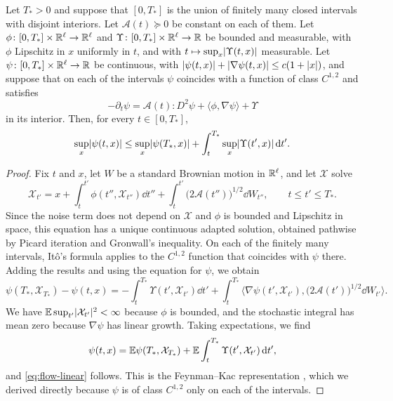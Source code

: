 \begin{lemma}\label{lem:flow-linear}
Let $T_*>0$ and suppose that $[0,T_*]$ is the union of finitely many closed
intervals with disjoint interiors. Let $\mathcal A(t)\succeq0$ be constant on each
of them. Let $\phi\colon[0,T_*]\times\mathbb R^\ell\to\mathbb R^\ell$ and
$\Upsilon\colon[0,T_*]\times\mathbb R^\ell\to\mathbb R$ be bounded and measurable, with $\phi$
Lipschitz in $x$ uniformly in $t$, and with $t\mapsto\sup_x\lvert \Upsilon(t,x)\rvert$
measurable. Let $\psi\colon[0,T_*]\times\mathbb R^\ell\to\mathbb R$ be continuous, with
$\lvert \psi(t,x)\rvert+\lvert \nabla\psi(t,x)\rvert\le c(1+\lvert x\rvert)$, and suppose that on each
of the intervals $\psi$ coincides with a function of class $C^{1,2}$ and satisfies
\[
 -\partial_t\psi=\mathcal A(t)\mathbin{:}D^2\psi+\langle\phi,\nabla\psi\rangle+\Upsilon
\]
in its interior. Then, for every $t\in[0,T_*]$,
\begin{equation}\label{eq:flow-linear}
 \sup_x\lvert \psi(t,x)\rvert\le\sup_x\lvert \psi(T_*,x)\rvert
 +\int_t^{T_*}\sup_x\lvert \Upsilon(t',x)\rvert\,\mathrm d t'.
\end{equation}
\end{lemma}

\begin{proof}
Fix $t$ and $x$, let $W$ be a standard Brownian motion in $\mathbb R^\ell$, and let
$\mathcal X$ solve
\[
 \mathcal X_{t'}=x+\int_t^{t'}\phi(t'',\mathcal X_{t''})\dd t''
 +\int_t^{t'}\bigl(2\mathcal A(t'')\bigr)^{1/2}\dd W_{t''},
 \qquad t\le t'\le T_*.
\]
Since the noise term does not depend on $\mathcal X$ and $\phi$ is bounded and Lipschitz
in space, this equation has a unique continuous adapted solution, obtained
pathwise by Picard iteration and Gronwall's inequality. On each of the finitely
many intervals, It\^o's formula \cite[Theorem~3.3.6]{karatzas-shreve-1991} applies
to the $C^{1,2}$ function that coincides with $\psi$ there. Adding the results and
using the equation for $\psi$, we obtain
\[
 \psi(T_*,\mathcal X_{T_*})-\psi(t,x)
 =-\int_t^{T_*}\Upsilon(t',\mathcal X_{t'})\dd t'
 +\int_t^{T_*}\bigl\langle\nabla\psi(t',\mathcal X_{t'}),
 \bigl(2\mathcal A(t')\bigr)^{1/2}\dd W_{t'}\bigr\rangle.
\]
We have $\mathbb E\sup_{t'}\lvert \mathcal X_{t'}\rvert^2<\infty$ because $\phi$ is bounded, and the
stochastic integral has mean zero because $\nabla\psi$ has linear growth. Taking expectations, we
find
\[
 \psi(t,x)=\mathbb E\psi(T_*,\mathcal X_{T_*})+\mathbb E\int_t^{T_*}\Upsilon(t',\mathcal X_{t'})\,\mathrm d t',
\]
and \eqref{eq:flow-linear} follows. This is the Feynman--Kac representation
\cite[Theorem~5.7.6]{karatzas-shreve-1991}, which we derived directly because
$\psi$ is of class $C^{1,2}$ only on each of the intervals.
\end{proof}

